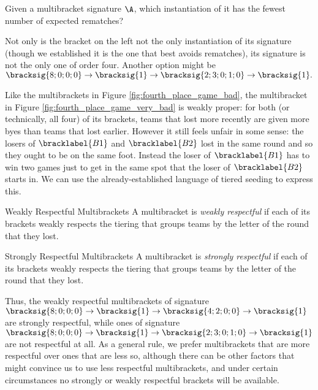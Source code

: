 {    \begin{oq}{}{}
        Given a multibracket signature $\A$, which instantiation of it has the fewest number of expected rematches?
    \end{oq}

    Not only is the bracket on the left not the only instantiation of its signature (though we established it is the one that best avoids rematches), its signature is not the only one of order four. Another option might be $\bracksig{8;0;0;0} \to \bracksig{1} \to \bracksig{2; 3; 0; 1; 0} \to \bracksig{1}.$


    Like the multibrackets in Figure \ref{fig:fourth_place_game_bad}, the multibracket in Figure \ref{fig:fourth_place_game_very_bad} is weakly proper: for both (or technically, all four) of its brackets, teams that lost more recently are given more byes than teams that lost earlier. However it still feels unfair in some sense: the losers of $\bracklabel{B1}$ and $\bracklabel{B2}$ lost in the same round and so they ought to be on the same foot. Instead the loser of $\bracklabel{B1}$ has to win two games just to get in the same spot that the loser of $\bracklabel{B2}$ starts in. We can use the already-established language of tiered seeding to express this.

    \begin{definition}{Weakly Respectful Multibrackets}{}
        A multibracket is \textit{weakly respectful} if each of its brackets weakly respects the tiering that groups teams by the letter of the round that they lost.
    \end{definition}

    \begin{definition}{Strongly Respectful Multibrackets}{}
        A multibracket is \textit{strongly respectful} if each of its brackets weakly respects the tiering that groups teams by the letter of the round that they lost.
    \end{definition}

    Thus, the weakly respectful multibrackets of signature $\bracksig{8;0;0;0} \to \bracksig{1} \to \bracksig{4; 2; 0; 0} \to \bracksig{1}$ are strongly respectful, while ones of signature $\bracksig{8;0;0;0} \to \bracksig{1} \to \bracksig{2; 3; 0; 1; 0} \to \bracksig{1}$ are not respectful at all. As a general rule, we prefer multibrackets that are more respectful over ones that are less so, although there can be other factors that might convince us to use less respectful multibrackets, and under certain circumstances no strongly or weakly respectful brackets will be available.

}

